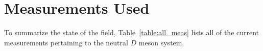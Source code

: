 \section{Measurements Used}
\label{sec:measurements}

To summarize the state of the field, Table~\ref{table:all_meas} lists all of
the current measurements pertaining to the neutral $D$ meson system.
